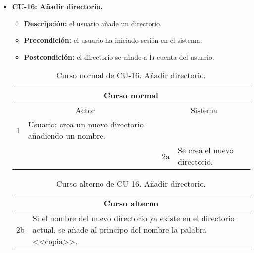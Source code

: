 \begin{itemize}
	\item \textbf{CU-16: Añadir directorio.}
	\begin{itemize}
		\item \textbf{Descripción:} el usuario añade un directorio.
		\item \textbf{Precondición:} el usuario ha iniciado sesión en el sistema.
		\item \textbf{Postcondición:} el directorio se añade a la cuenta del usuario.
	\end{itemize}
	\begin{table}[H]
		\centering
		\begin{tabular}{|p{0.3cm}|p{5cm}|p{0.3cm}|p{5cm}|}
			\hline
			\multicolumn{4}{|c|}{Curso normal} \\ \hline
			\multicolumn{2}{|c|}{Actor} & \multicolumn{2}{|c|}{Sistema} \\ \hline
			1 & Usuario: crea un nuevo directorio añadiendo un nombre. &  &  \\ \hline
			&  & 2a & Se crea el nuevo directorio. \\ \hline
		\end{tabular}
		\caption{Curso normal de CU-16. Añadir directorio.}
		\label{tabla:cu16-normal}
	\end{table}
	
	\begin{table}[H]
		\centering
		\begin{tabular}{|p{0.3cm}|p{10cm}|}
			\hline
			\multicolumn{2}{|c|}{Curso alterno} \\ \hline
			2b & Si el nombre del nuevo directorio ya existe en el directorio actual, se añade al principo del nombre la palabra <<copia>>. \\ \hline
		\end{tabular}
		\caption{Curso alterno de CU-16. Añadir directorio.}
		\label{tabla:cu16-alterno}
	\end{table}
\end{itemize}

